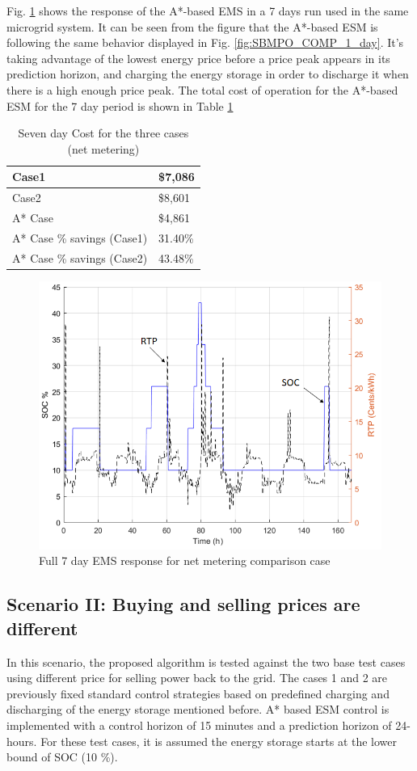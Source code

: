 Fig. \ref{fig:SBMPO_COMP_10_12} shows the response of the A*-based EMS in a  7 days run used in the same microgrid system.  It can be seen from the figure that the A*-based ESM is following the same behavior displayed in Fig. \ref{fig:SBMPO_COMP_1_day}. It's taking advantage of the lowest energy price before a price peak appears in its prediction horizon, and charging the energy storage in order to discharge it when there is a high enough price peak. The total cost of operation for the A*-based ESM for the 7 day period is shown in Table \ref{tab:Cost1}

\begin{table}[htb]
\caption{Seven day Cost for the three cases (net metering)}
\centering
\label{tab:Cost1}
\begin{tabular}{|l|l|}
\hline
Case1 & \$7,086 \\ \hline
Case2 & \$8,601 \\ \hline
A* Case & \$4,861 \\ \hline
A* Case \% savings (Case1) & 31.40\% \\ \hline
A* Case \% savings (Case2) & 43.48\% \\ \hline

\end{tabular}
\end{table}

\begin{figure}[!ht]
    \centering
    \includegraphics[width = 0.8\linewidth]{figs/SBMPO_COMP_10_12.png}
    \caption{Full 7 day EMS response for net metering comparison case}
    \label{fig:SBMPO_COMP_10_12}
\end{figure}

\subsection{Scenario II: Buying and selling prices are different}
In this scenario, the proposed algorithm is tested against the two base test cases using different price for selling power back to the grid. The cases 1 and 2 are previously fixed standard control strategies based on predefined charging and discharging of the energy storage mentioned before. A* based ESM control is implemented with a control horizon of 15 minutes and a prediction horizon of 24-hours. For these test cases, it is assumed the energy storage starts at the lower bound of SOC (10 \%).

